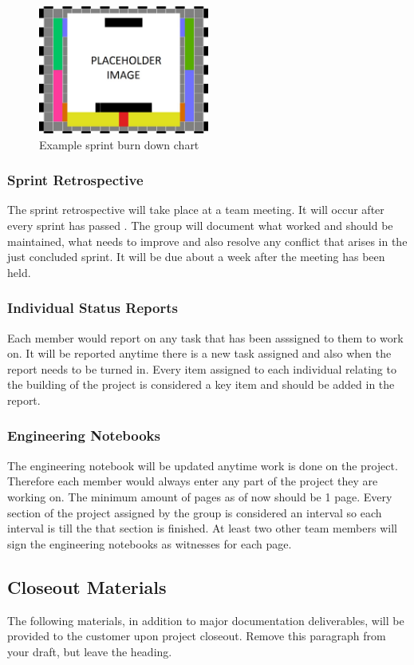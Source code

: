 \begin{figure}[h!]
    \centering
    \includegraphics[width=0.5\textwidth]{images/test_image}
    \caption{Example sprint burn down chart}
\end{figure}

\subsubsection{Sprint Retrospective}
The sprint retrospective will take place at a team meeting. It will occur after every sprint has passed . The group will document what worked and should be maintained, what needs to improve and also resolve any conflict that arises in the just concluded sprint. It will be due about a week after the meeting has been held.

\subsubsection{Individual Status Reports}
Each member would report on any task that has been asssigned to them to work on. It will be reported anytime there is a new task assigned and also when the report needs to be turned in. Every item assigned to each individual relating to the building of the project is considered a key item and should be added in the report.

\subsubsection{Engineering Notebooks}
The engineering notebook will be updated anytime work is done on the project. Therefore each member would always enter any part of the project they are working on. The minimum amount of pages as of now should be 1 page. Every section of the project assigned by the group is considered an interval so each interval is till the that section is finished. At least two other team members will sign the engineering notebooks as witnesses for each page.

\subsection{Closeout Materials}
The following materials, in addition to major documentation deliverables, will be provided to the customer upon project closeout. Remove this paragraph from your draft, but leave the heading.

